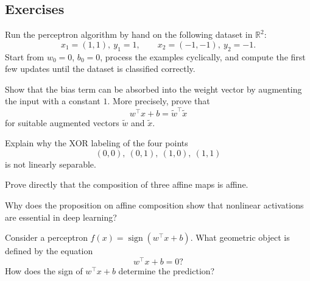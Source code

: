 
\subsection*{Exercises}

\begin{exercise}
Run the perceptron algorithm by hand on the following dataset in $\mathbb R^2$:
\[
x_1=(1,1),\ y_1=1,
\qquad
x_2=(-1,-1),\ y_2=-1.
\]
Start from $w_0=0$, $b_0=0$, process the examples cyclically, and compute the first few updates until the dataset is classified correctly.
\end{exercise}

\begin{exercise}
Show that the bias term can be absorbed into the weight vector by augmenting the input with a constant $1$. More precisely, prove that
\[
w^\top x+b = \tilde w^\top \tilde x
\]
for suitable augmented vectors $\tilde w$ and $\tilde x$.
\end{exercise}

\begin{exercise}
Explain why the XOR labeling of the four points
\[
(0,0),\ (0,1),\ (1,0),\ (1,1)
\]
is not linearly separable.
\end{exercise}

\begin{exercise}
Prove directly that the composition of three affine maps is affine.
\end{exercise}

\begin{exercise}
Why does the proposition on affine composition show that nonlinear activations are essential in deep learning?
\end{exercise}

\begin{exercise}
Consider a perceptron $f(x)=\operatorname{sign}(w^\top x+b)$. What geometric object is defined by the equation
\[
w^\top x+b=0?
\]
How does the sign of $w^\top x+b$ determine the prediction?
\end{exercise}

